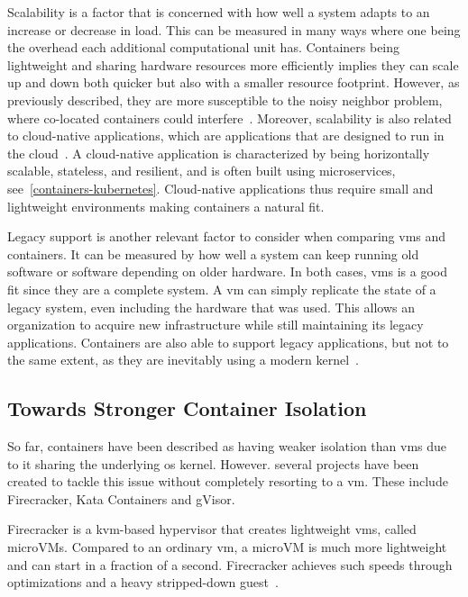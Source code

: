 \documentclass{kththesis}
\begin{document}
Scalability is a factor that is concerned with how well a system adapts to an increase or decrease in load. This can be measured in many ways where one being the overhead each additional computational unit has. Containers being lightweight and sharing hardware resources more efficiently implies they can scale up and down both quicker but also with a smaller resource footprint. However, as previously described, they are more susceptible to the noisy neighbor problem, where co-located containers could interfere\ \cite{container-vm-scale, container-vm-decision}. Moreover, scalability is also related to cloud-native applications, which are applications that are designed to run in the cloud\ \cite{cloud-native}. A cloud-native application is characterized by being horizontally scalable, stateless, and resilient, and is often built using microservices, see\ \ref{containers-kubernetes}. Cloud-native applications thus require small and lightweight environments making containers a natural fit.

Legacy support is another relevant factor to consider when comparing \Glspl{vm} and containers. It can be measured by how well a system can keep running old software or software depending on older hardware. In both cases, \Glspl{vm} is a good fit since they are a complete system. A \Gls{vm} can simply replicate the state of a legacy system, even including the hardware that was used. This allows an organization to acquire new infrastructure while still maintaining its legacy applications. Containers are also able to support legacy applications, but not to the same extent, as they are inevitably using a modern kernel\ \cite{container-vm-decision,vm-decision-microsoft}.

\subsection{Towards Stronger Container Isolation}
So far, containers have been described as having weaker isolation than \Glspl{vm} due to it sharing the underlying \Gls{os} kernel. However. several projects have been created to tackle this issue without completely resorting to a \Gls{vm}. These include Firecracker, Kata Containers and gVisor.

Firecracker is a \Gls{kvm}-based hypervisor that creates lightweight \Glspl{vm}, called microVMs. Compared to an ordinary \Gls{vm}, a microVM is much more lightweight and can start in a fraction of a second. Firecracker achieves such speeds through optimizations and a heavy stripped-down guest\ \cite{container-runtimes-overview, container-firecracker}.
\end{document}

